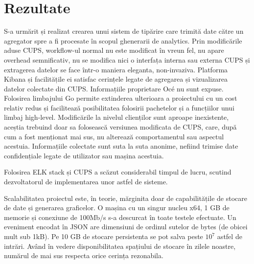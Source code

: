 \documentclass[a4paper, 12pt, twoside]{report}
\begin{document}
{\chapter{Rezultate}
S-a urmărit și realizat crearea unui sistem de tipărire care trimită date către un agregator spre a fi procesate în scopul ghenerarii de analytics. Prin modificările aduse CUPS, workflow-ul normal nu este modificat în vreun fel, nu apare overhead semnificativ, nu se modifica nici o interfața interna sau externa CUPS și extragerea datelor se face într-o maniera eleganta, non-invaziva. Platforma Kibana și facilitățile ei satisfac cerințele legate de agregarea și vizualizarea datelor colectate din CUPS. Informațiile proprietare Océ nu sunt expuse. Folosirea limbajului Go permite extinderea ulterioara a proiectului cu un cost relativ redus și facilitează posibilitatea folosirii pachetelor și a funcțiilor unui limbaj high-level. Modificările la nivelul clienților sunt aproape inexistente, aceștia trebuind doar sa folosească versiunea modificata de CUPS, care, după cum a fost menționat mai sus, nu alterează comportamentul sau aspectul acestuia. Informațiile colectate sunt suta la suta anonime, nefiind trimise date confidențiale legate de utilizator sau mașina acestuia.

Folosirea ELK stack și CUPS a scăzut considerabil timpul de lucru, scutind dezvoltatorul de implementarea unor astfel de sisteme.

Scalabilitatea proiectul este, în teorie, mărginita doar de capabilitățile de stocare de date și generarea graficelor. O mașina cu un singur nucleu x64, 1 GB de memorie și conexiune de 100Mb/s s-a descurcat în toate testele efectuate. Un eveniment encodat în JSON are dimensiuni de ordinul sutelor de bytes (de obicei mult sub 1kB). Pe 10 GB de stocare persistenta se pot salva peste \begin{math} 10^7 \end{math} astfel de intrări. Având în vedere disponibilitatea spațiului de stocare în zilele noastre, numărul de mai sus respecta orice cerința rezonabila. 

}
\end{document}
